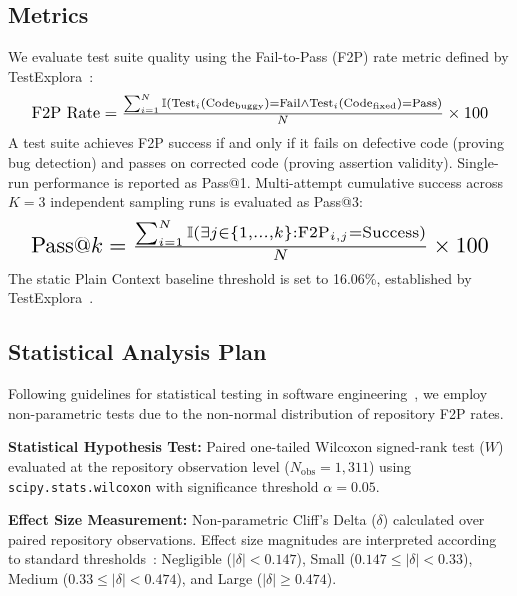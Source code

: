 \subsection{Metrics}
\label{subsec:metrics}
We evaluate test suite quality using the Fail-to-Pass (F2P) rate metric defined by TestExplora~\cite{testexplora}:
\begin{equation}
\resizebox{0.95\columnwidth}{!}{$
\text{F2P Rate} = \frac{\sum_{i=1}^{N} \mathbb{I}(\text{Test}_i(\text{Code}_{\text{buggy}}) = \text{Fail} \land \text{Test}_i(\text{Code}_{\text{fixed}}) = \text{Pass})}{N} \times 100
$}
\end{equation}
A test suite achieves F2P success if and only if it fails on defective code (proving bug detection) and passes on corrected code (proving assertion validity). Single-run performance is reported as Pass@1. Multi-attempt cumulative success across $K=3$ independent sampling runs is evaluated as Pass@3:
\begin{equation}
\resizebox{0.95\columnwidth}{!}{$
\text{Pass@}k = \frac{\sum_{i=1}^{N} \mathbb{I}\left( \exists j \in \{1,\dots,k\}: \text{F2P}_{i,j} = \text{Success} \right)}{N} \times 100
$}
\end{equation}
The static Plain Context baseline threshold is set to 16.06\%, established by TestExplora~\cite{testexplora}.

\subsection{Statistical Analysis Plan}
\label{subsec:stat}
Following guidelines for statistical testing in software engineering~\cite{arcuri2011practical}, we employ non-parametric tests due to the non-normal distribution of repository F2P rates.

\textbf{Statistical Hypothesis Test:} Paired one-tailed Wilcoxon signed-rank test ($W$) evaluated at the repository observation level ($N_{\text{obs}} = 1,311$) using \texttt{scipy.stats.wilcoxon} with significance threshold $\alpha = 0.05$.

\textbf{Effect Size Measurement:} Non-parametric Cliff's Delta ($\delta$) calculated over paired repository observations. Effect size magnitudes are interpreted according to standard thresholds~\cite{arcuri2011practical, cliffs}: Negligible ($|\delta| < 0.147$), Small ($0.147 \le |\delta| < 0.33$), Medium ($0.33 \le |\delta| < 0.474$), and Large ($|\delta| \ge 0.474$).
